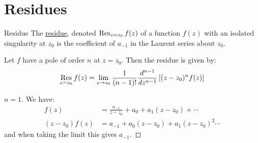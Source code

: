 \documentclass[../Main.tex]{subfiles}
\begin{document}
\section{Residues}
\begin{definition}{Residue}
    The \underline{residue}, denoted $\operatorname*{Res}_{z = z_0} f(z)$ of a function $f(z)$ with an isolated singularity at $z_0$ is the coefficient of $a_{-1}$ in the Laurent series about $z_0$.
\end{definition}
\begin{proposition}
    Let $f$ have a pole of order $n$ at $z = z_0$. Then the residue is given by:
    \begin{equation*}
        \operatorname*{Res}_{z = z_0} f(z) = \lim_{z \to z_0} \frac{1}{(n-1)!} \frac{d^{n-1}}{dz^{n-1}} \left[(z - z_0)^n f(z)\right]
    \end{equation*}
    \label{propResDerivatives}
\end{proposition}
\begin{proof}[$n = 1$]
    We have:
    \begin{align*}
        f(z) &= \frac{a_{-1}}{z - z_0} + a_0 + a_1(z - z_0) + \cdots \\
        (z - z_0) f(z) &= a_{-1} + a_0 (z - z_0) + a_1 (z - z_0)^2 \cdots
    \end{align*}
    and when taking the limit this gives $a_{-1}$.
\end{proof}
\end{document}
